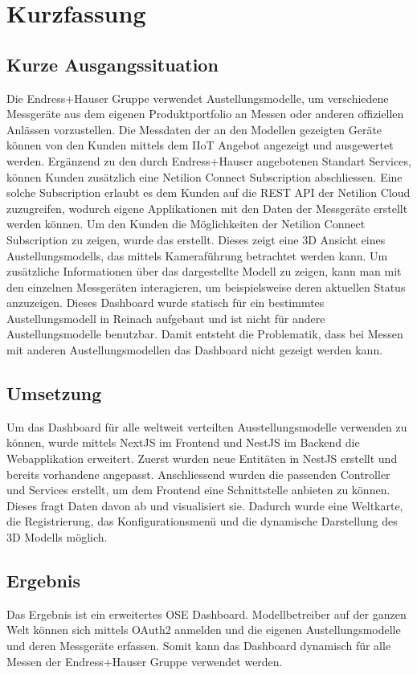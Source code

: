 \chapter*{Kurzfassung}
\vspace{-3.5cm}
\section*{Kurze Ausgangssituation}
\vspace{-0.2cm}
Die Endress+Hauser Gruppe verwendet Austellungsmodelle, um verschiedene Messgeräte aus dem eigenen Produktportfolio an Messen oder anderen offiziellen Anlässen vorzustellen. Die Messdaten der an den Modellen gezeigten Geräte können von den Kunden mittels dem IIoT Angebot  angezeigt und ausgewertet werden.
Ergänzend zu den durch Endress+Hauser angebotenen Standart Services, können Kunden zusätzlich eine Netilion Connect Subscription abschliessen. Eine solche Subscription erlaubt es dem Kunden auf die REST API der Netilion Cloud zuzugreifen, wodurch eigene Applikationen mit den Daten der Messgeräte erstellt werden können.
Um den Kunden die Möglichkeiten der Netilion Connect Subscription zu zeigen, wurde das  erstellt. Dieses zeigt eine 3D Ansicht eines Austellungsmodells, das mittels Kameraführung betrachtet werden kann. Um zusätzliche Informationen über das dargestellte Modell zu zeigen, kann man mit den einzelnen Messgeräten interagieren, um beispielsweise deren aktuellen Status anzuzeigen.
Dieses Dashboard wurde statisch für ein bestimmtes Austellungsmodell in Reinach aufgebaut und ist nicht für andere Austellungsmodelle benutzbar. Damit entsteht die Problematik, dass bei Messen mit anderen Austellungsmodellen das Dashboard nicht gezeigt werden kann.

\vspace{-0.3cm}
\section*{Umsetzung}
\vspace{-0.2cm}

Um das Dashboard für alle weltweit verteilten Ausstellungsmodelle verwenden zu können, wurde mittels NextJS im Frontend und NestJS im Backend die Webapplikation erweitert. Zuerst wurden neue Entitäten in NestJS erstellt und bereits vorhandene angepasst. Anschliessend wurden die passenden Controller und Services erstellt, um dem Frontend eine Schnittstelle anbieten zu können. Dieses fragt Daten davon ab und visualisiert sie. Dadurch wurde eine Weltkarte, die Registrierung, das Konfigurationsmenü und die dynamische Darstellung des 3D Modells möglich.

\vspace{-0.3cm}
\section*{Ergebnis}
\vspace{-0.2cm}

Das Ergebnis ist ein erweitertes OSE Dashboard. Modellbetreiber auf der ganzen Welt können sich mittels OAuth2 anmelden und die eigenen Austellungsmodelle und deren Messgeräte erfassen. Somit kann das Dashboard dynamisch für alle Messen der Endress+Hauser Gruppe verwendet werden.
